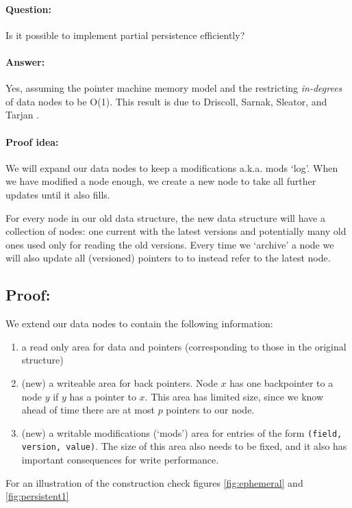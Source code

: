 \documentclass[11pt]{article}
\begin{document}
\paragraph{Question:}
Is it possible to implement partial persistence efficiently?

\paragraph{Answer:}
Yes, assuming the pointer machine memory model and the restricting {\em in-degrees} of data nodes to be O(1). This result is due to Driscoll, Sarnak, Sleator, and Tarjan \cite{dsst}.

\paragraph{Proof idea:}
We will expand our data nodes to keep a modifications a.k.a. mods `log'. When we have modified a node enough, we create a new node to take all further updates until it also fills. 

For every node in our old data structure, the new data structure will have a collection of nodes: one current with the latest versions and potentially many old ones used only for reading the old versions. Every time we `archive' a node we will also update all (versioned) pointers to to instead refer to the latest node.

\subsection{Proof:}

We extend our data nodes to contain the following information:

\begin{enumerate}
\item a read only area for data and pointers (corresponding to those in the original structure)
\item (new) a writeable  area for back pointers. Node \(x\) has one backpointer to a node \(y\) if \(y\) has a pointer to \(x\).
This area has limited size, since we know ahead of time there are at most $p$ pointers to our node.
\item (new) a writable modifications (`mods') area for entries of the form \verb|(field, version, value)|. The size of this 
area also needs to be fixed, and it also has important consequences for write performance.
\end{enumerate}

For an illustration of the construction check figures \ref{fig:ephemeral} and \ref{fig:persistent1}
\end{document}
